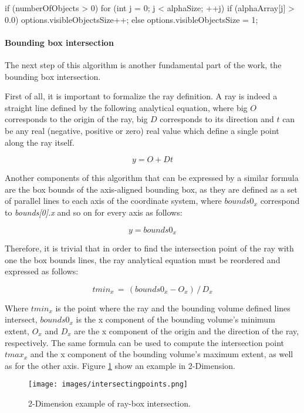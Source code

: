\documentclass[12pt,a4paper]{extarticle}
\begin{document}
\begin{cpp}[caption={Computation of the number of visible objects concerning the defined elements of the alphaArray with opacity greater than zero},label=code:visibleObjSize]
if (numberOfObjects > 0) {
	for (int j = 0; j < alphaSize; ++j) {
		if (alphaArray[j] > 0.0) {
			options.visibleObjectsSize++;
		}
	}
} else {
	options.visibleObjectsSize = 1;
}
\end{cpp}

\paragraph{Bounding box intersection} The next step of this algorithm is another fundamental part of the work\cite{levoy_1988:4}, the bounding box intersection.

First of all, it is important to formalize the ray definition. A ray is indeed a straight line defined by the following analytical equation, where big $O$ corresponds to the origin of the ray, big $D$ corresponds to its direction and $t$ can be any real (negative, positive or zero) real value which define a single point along the ray itself.

\[
y = O +Dt
\]

Another components of this algorithm that can be expressed by a similar formula are the box bounds of the axis-aligned bounding box,  as they are defined as a set of parallel lines to each axis of the coordinate system, where $bounds0_{x}$ correspond to \textit{bounds[0].x} and so on for every axis as follows:

\[
y = bounds0_{x}
\] 

Therefore, it is trivial that in order to find the intersection point of the ray with one the box bounds lines, the ray analytical equation must be reordered and expressed as follows:

\[
tmin_{x}\,=\,(bounds0_{x} - O_{x})\,/\,D_{x}
\] 

Where $tmin_{x}$ is the point where the ray and the bounding volume defined lines intersect, $bounds0_{x}$ is the x component of the bounding volume's minimum extent, $O_{x}$ and $D_{x}$ are the x component of the origin and the direction of the ray, respectively. The same formula can be used to compute the intersection point $tmax_{x}$ and the x component of the bounding volume's maximum extent, as well as for the other axis. Figure \ref{fig:intersectingpoints} show an example in 2-Dimension.

\begin{figure}[hbtp]
\centering
\texttt{[image: images/intersectingpoints.png]}
\caption{2-Dimension example of ray-box intersection.}
\label{fig:intersectingpoints}
\end{figure}
\end{document}
